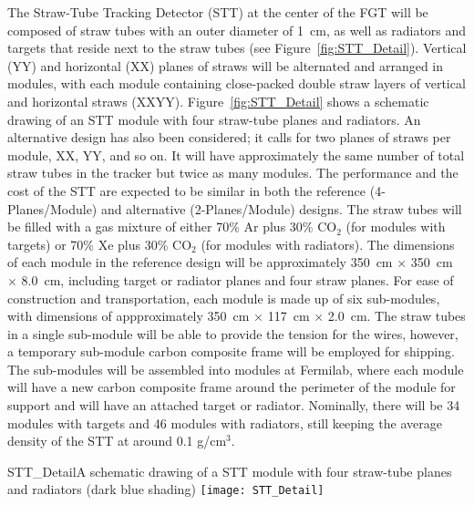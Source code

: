 The Straw-Tube Tracking Detector (STT) %
at the center of the FGT %
will be composed of straw tubes with an outer diameter of 1~cm, as well as 
radiators and targets that reside next to the straw tubes (see Figure~\ref{fig:STT_Detail}).
Vertical (YY) and horizontal (XX) planes of straws will be alternated and 
arranged in modules, with each module containing close-packed double straw layers 
of vertical and horizontal straws (XXYY). 
Figure~\ref{fig:STT_Detail} shows a schematic drawing of an STT module with four straw-tube planes and
radiators. 
An alternative design has also been considered; it calls for two planes of straws
per module, XX, YY, and so on. It will have approximately the same number of
total straw tubes in the tracker but twice as many modules. 
The performance and the cost of the STT are expected to be similar 
in both the reference (4-Planes/Module) and alternative (2-Planes/Module) designs.
 The straw tubes will be filled with a
gas mixture of either 70\% Ar plus 30\% CO$_2$ (for modules with targets) or
70\% Xe plus 30\% CO$_2$ (for modules with radiators). 
The dimensions of each module in the reference design will
be approximately 350~cm $\times$ 350~cm $\times$ 8.0~cm, including 
target or radiator planes and four straw planes. For ease of construction and
transportation, each module is made up of six sub-modules, with dimensions of
appproximately 350~cm $\times$ 117~cm $\times$ 2.0~cm. 
The straw tubes in a single sub-module will be able to provide the tension 
for the wires, however, a temporary sub-module carbon composite frame will 
be employed for shipping. The sub-modules will be assembled %
into modules 
at Fermilab, where each module will have a new carbon composite frame around 
the perimeter of the module for support and will have an attached target or 
radiator. Nominally, there will be 34 modules with targets and 46 modules 
with radiators, still keeping the 
average density of the STT at around 0.1 g/cm$^3$. 


\begin{cdrfigure}{STT_Detail}{A schematic drawing of a STT module with four straw-tube planes and
radiators (dark blue shading)}
\texttt{[image: STT\_Detail]}
\end{cdrfigure}

